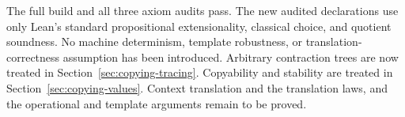 






The full build and all three axiom audits pass. The new audited declarations
use only Lean's standard propositional extensionality, classical choice, and
quotient soundness. No machine determinism, template robustness, or
translation-correctness assumption has been introduced. Arbitrary contraction
trees are now treated in Section~\ref{sec:copying-tracing}. Copyability and stability are treated in Section~\ref{sec:copying-values}.
Context translation and the translation laws,
and the operational and template arguments remain to be proved.
